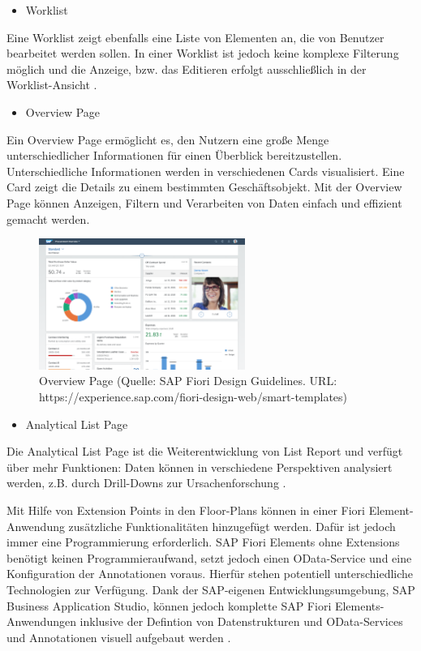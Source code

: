 \begin{itemize}[noitemsep]
\item Worklist
\end{itemize}

Eine Worklist zeigt ebenfalls eine Liste von Elementen an, die von Benutzer bearbeitet werden sollen. In einer Worklist ist jedoch keine komplexe Filterung möglich und die Anzeige, bzw. das Editieren erfolgt ausschließlich in der Worklist-Ansicht \cite{sap:ufef}.

\begin{itemize}[noitemsep]
\item Overview Page
\end{itemize}

Ein Overview Page ermöglicht es, den Nutzern eine große Menge unterschiedlicher Informationen für einen Überblick bereitzustellen. Unterschiedliche Informationen werden in verschiedenen Cards visualisiert. Eine Card zeigt die Details zu einem bestimmten Geschäftsobjekt. Mit der Overview Page können Anzeigen, Filtern und Verarbeiten von Daten einfach und effizient gemacht werden.

\begin{figure}[htbp]
 \centering
 \includegraphics[width=0.6\textwidth]{Bilder/fiori_element/Overview-page.png}
 \caption{Overview Page (Quelle: SAP Fiori Design Guidelines. URL: https://experience.sap.com/fiori-design-web/smart-templates)}
\end{figure} 

\begin{itemize}[noitemsep]
\item Analytical List Page
\end{itemize}

Die Analytical List Page ist die Weiterentwicklung von List Report und verfügt über mehr Funktionen: Daten können in verschiedene Perspektiven analysiert werden, z.B. durch Drill-Downs zur Ursachenforschung \cite{sap:ufef}.

Mit Hilfe von Extension Points in den Floor-Plans können in einer Fiori Element-Anwendung zusätzliche Funktionalitäten hinzugefügt werden. Dafür ist jedoch immer eine Programmierung erforderlich.
SAP Fiori Elements ohne Extensions benötigt keinen Programmieraufwand, setzt jedoch einen OData-Service und eine Konfiguration der Annotationen voraus. Hierfür stehen potentiell unterschiedliche Technologien zur Verfügung. Dank der SAP-eigenen Entwicklungsumgebung, SAP Business Application Studio, können jedoch komplette SAP Fiori Elements-Anwendungen inklusive der Defintion von Datenstrukturen und OData-Services und Annotationen visuell aufgebaut werden \cite{sap:dafe}.



